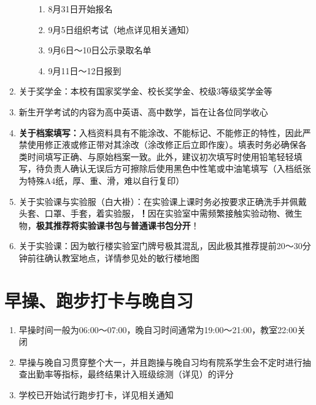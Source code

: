 \begin{enumerate}
\begin{enumerate}
\begin{enumerate}
                        \item 8月31日开始报名
                        \item 9月5日组织考试（地点详见相关通知）
                        \item 9月6日～10日公示录取名单\footnotemark
                        \item 9月11日～12日报到
                    \end{enumerate}
          \end{enumerate}
    \item 关于奖学金\footnotemark：本校有国家奖学金、校长奖学金、校级3等级奖学金等
    \item 新生开学考试\footnotemark 的内容为高中英语、高中数学，旨在让各位同学收心
    \item \textbf{关于档案填写：}入档资料具有不能涂改、不能标记、不能修正的特性，因此严禁使用修正液或修正带对其涂改（涂改修正后立即作废）。填表时务必确保各类时间填写正确、与原始档案一致。此外，建议初次填写时使用铅笔轻轻填写，待负责人确认无误后方可擦除后使用黑色中性笔或中油笔填写（入档纸张为特殊A4纸，厚、重、滑，难以自行复印）
    \item 关于实验课与实验服（白大褂）：在实验课上课时务必按要求正确洗手并佩戴头套、口罩、手套，着实验服，\textbf{！}因在实验室中需频繁接触实验动物、微生物，\textbf{极其推荐将实验课书包与普通课书包分开}！
          \label{schoolbag}
    \item 关于实验课：因为敏行楼实验室门牌号极其混乱，因此极其推荐提前20～30分钟前往确认教室地点，详情参见处的敏行楼地图
\end{enumerate}

\section[早操、跑步打卡与晚自习]{早操、跑步打卡与晚自习}
\begin{enumerate}
    \item 早操时间一般为06:00～07:00，晚自习时间通常为19:00～21:00，教室22:00关闭
    \item 早操与晚自习贯穿整个大一\footnotemark，并且跑操与晚自习均有院系学生会不定时进行抽查出勤率等指标，最终结果计入班级综测（详见）的评分
    \item 学校已开始试行跑步打卡，详见相关通知
\end{enumerate}

